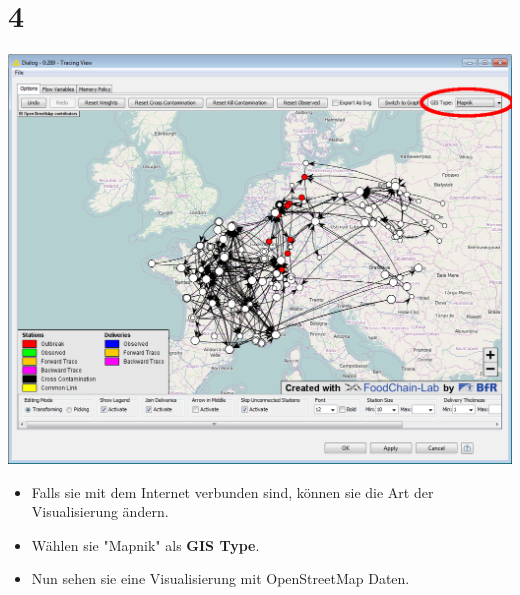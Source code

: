 \documentclass{beamer}
\begin{document}
\section{4}
\begin{frame}
	\begin{center}
  		\includegraphics[height=0.6\textheight]{4.png}
	\end{center}
	\begin{itemize}
		\item Falls sie mit dem Internet verbunden sind, können sie die Art der Visualisierung ändern.
		\item Wählen sie "Mapnik" als \textbf{GIS Type}.
		\item Nun sehen sie eine Visualisierung mit OpenStreetMap Daten.
	\end{itemize}
\end{frame}
\end{document}
